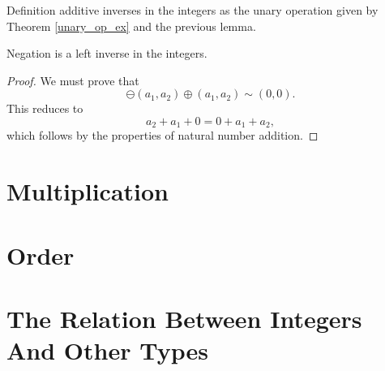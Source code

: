 \documentclass[../../math.tex]{subfiles}
\begin{document}
\begin{instance}
    Definition additive inverses in the integers as the unary operation given by
    Theorem \ref{unary_op_ex} and the previous lemma.
\end{instance}

\begin{instance}
    Negation is a left inverse in the integers.
\end{instance}
\begin{proof}
    We must prove that
    \[
        \ominus (a_1, a_2) \oplus (a_1, a_2) \sim (0, 0).
    \]
    This reduces to
    \[
        a_2 + a_1 + 0 = 0 + a_1 + a_2,
    \]
    which follows by the properties of natural number addition.
\end{proof}

\section{Multiplication}

\section{Order}

\section{The Relation Between Integers And Other Types}
\end{document}
